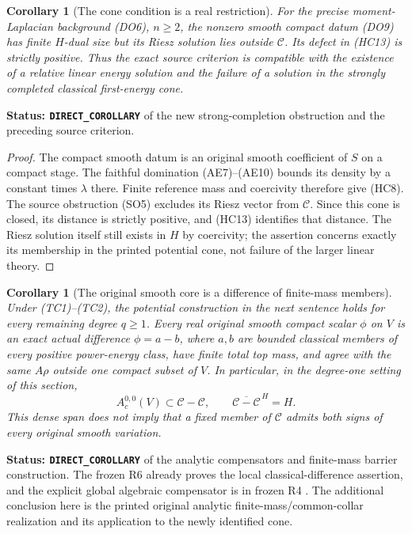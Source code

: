 \documentclass[11pt,a4paper]{article}
\numberwithin{equation}{section}
\newtheorem{corollary}[theorem]{Corollary}
\theoremstyle{definition}
\theoremstyle{remark}
\begin{document}
\begin{corollary}[The cone condition is a real restriction]
\label{cor:r11-strong-Hilbert-cone-proper}
For the precise moment-Laplacian background (DO6), $n\geq2$,
the nonzero smooth compact datum (DO9) has finite $H$-dual
size but its Riesz solution lies outside $\mathcal C$.
Its defect in (HC13) is strictly positive. Thus the exact
source criterion is compatible with the existence of a
relative linear energy solution and the failure of a solution
in the strongly completed classical first-energy cone.
\end{corollary}

\noindent\textbf{Status: \texttt{DIRECT\_COROLLARY}} of the new
strong-completion obstruction and the preceding source criterion.

\begin{proof}
The compact smooth datum is an original smooth coefficient
of $S$ on a compact stage. The faithful domination (AE7)--(AE10)
bounds its density by a constant times $\lambda$ there.
Finite reference mass and coercivity therefore give (HC8).
The source obstruction (SO5) excludes its Riesz vector from
$\mathcal C$. Since this cone is closed, its distance is
strictly positive, and (HC13) identifies that distance.
The Riesz solution itself still exists in $H$ by coercivity;
the assertion concerns exactly its membership in the printed
potential cone, not failure of the larger linear theory.
\end{proof}

\begin{corollary}[The original smooth core is a difference of finite-mass members]
\label{cor:r11-finite-mass-core-differences}
Under (TC1)--(TC2), the potential construction in the next
sentence holds for every remaining degree $q\geq1$.
Every real original smooth compact scalar $\phi$ on $V$ is
an exact actual difference $\phi=a-b$, where $a,b$ are bounded
classical members of every positive power-energy class, have
finite total top mass, and agree with the same $A\rho$ outside
one compact subset of $V$. In particular, in the degree-one
setting of this section,
\[
                    A_c^{0,0}(V)\subset\mathcal C-\mathcal C,
                    \qquad\overline{\mathcal C-\mathcal C}^{\,H}=H.
 \tag{HC14}
\]
This dense span does not imply that a fixed member of
$\mathcal C$ admits both signs of every original smooth
variation.
\end{corollary}

\noindent\textbf{Status: \texttt{DIRECT\_COROLLARY}} of the
analytic compensators and finite-mass barrier construction.
The frozen R6  already
proves the local classical-difference assertion, and the
explicit global algebraic compensator is in frozen R4
. The additional conclusion
here is the printed original analytic finite-mass/common-collar
realization and its application to the newly identified cone.
\end{document}
